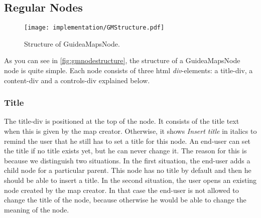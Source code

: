 \subsection{Regular Nodes}

\begin{figure}[H]
	\centering
	\texttt{[image: implementation/GMStructure.pdf]}
	\caption{Structure of GuideaMapsNode.}
	\label{fig:gmnodestructure}
\end{figure}

As you can see in \autoref{fig:gmnodestructure}, the structure of a GuideaMapsNode node is quite simple. Each node consists of three html \textit{div}-elements: a title-div, a content-div and a controls-div explained below.

\subsubsection{Title}
The title-div is positioned at the top of the node. It consists of the title text when this is given by the map creator. Otherwise, it shows \textit{Insert title} in italics to remind the user that he still has to set a title for this node. An end-user can set the title if no title exists yet, but he can never change it. The reason for this is because we distinguish two situations. In the first situation, the end-user adds a child node for a particular parent. This node has no title by default and then he should be able to insert a title. In the second situation, the user opens an existing node created by the map creator. In that case the end-user is not allowed to change the title of the node, because otherwise he would be able to change the meaning of the node. \\

